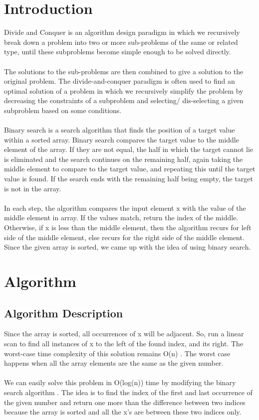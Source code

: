 \documentclass[conference]{IEEEtran}
\begin{document}
\section{Introduction}
Divide and Conquer is an algorithm design paradigm in which we recursively break down a problem into two or more sub-problems of the same or related type, until these subproblems become simple enough to be solved directly. \\ \\
The solutions to the sub-problems are then combined
to give a solution to the original problem.
The divide-and-conquer paradigm is often used to find an optimal solution of a problem in which we recursively simplify the problem by decreasing the constraints of a subproblem and selecting/ dis-selecting a given subproblem based on some conditions. \\ \\
Binary search is a search algorithm that finds the position of a target value within a sorted array. Binary search compares the target value to the middle element of the array. If they are not equal, the half in which the target cannot lie is eliminated and the search continues on the remaining half, again taking the middle element to compare to the target value, and repeating this until the target value is found. If the search ends with the remaining half being empty, the target is not in the array. \\ \\
In each step, the algorithm compares the input element x with the value of the middle element in array. If the values match, return the index of the middle. Otherwise, if x is less than the middle element, then the algorithm recurs for left side of the middle element, else recurs for the right side of the middle element. Since the given array is sorted, we came up with the idea of using binary search.\\


\section{Algorithm}

\subsection{Algorithm Description}

Since the array is sorted, all occurrences of x will be adjacent. So, run a linear scan to find all instances of x to the left of the found index, and its right. The worst-case time complexity of this solution remains O(n) . The worst case happens when all the array elements are the same as the given number.\\ \\
We can easily solve this problem in O(log(n)) time by modifying the binary search algorithm . The idea is to find the index of the first and last occurrence of the given number and return one more than the difference between two indices because the array is sorted and all the x’s are between these two indices only. \\ \\
\end{document}
